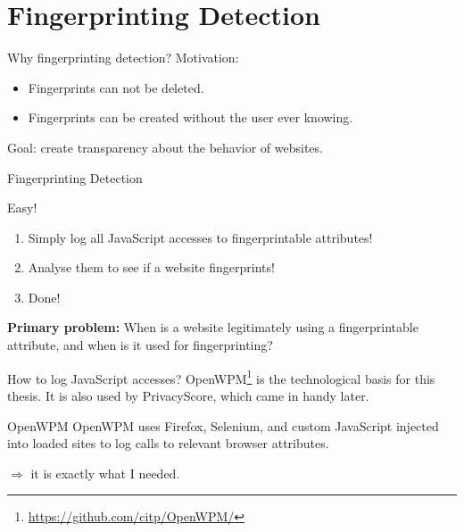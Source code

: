 \documentclass[t]{beamer}
\begin{document}
\section{Fingerprinting Detection}
\begin{frame}{Why fingerprinting detection?}
    Motivation:
    \begin{itemize}
        \pause
        \item Fingerprints can not be deleted.
        \pause
        \item Fingerprints can be created without the user ever knowing.
    \end{itemize}

    \pause

    Goal: create transparency about the behavior of websites.
\end{frame}

\begin{frame}{Fingerprinting Detection}
    \pause

    Easy!

    \vspace{0.7cm}

    \pause

    \begin{enumerate}
        \item Simply log all JavaScript accesses to fingerprintable attributes!
        \pause
        \item Analyse them to see if a website fingerprints!
        \pause
        \item Done!
    \end{enumerate}

    \pause

    \vspace{0.7cm}

    \textbf{Primary problem:}
    \pause
    When is a website legitimately using a fingerprintable attribute,
    and when is it used for fingerprinting?
\end{frame}

\begin{frame}{How to log JavaScript accesses?}
    OpenWPM\footnote{\url{https://github.com/citp/OpenWPM/}} is the technological basis for this thesis.
    It is also used by PrivacyScore, which came in handy later.
    \vspace{0.5cm}

    \pause

    \begin{block}{OpenWPM}
        OpenWPM uses Firefox, Selenium, and custom JavaScript injected into loaded sites to log
calls to relevant browser attributes.
    \end{block}
    \vspace{0.5cm}

    \pause

    $\Rightarrow$ it is exactly what I needed.
\end{frame}
\end{document}

